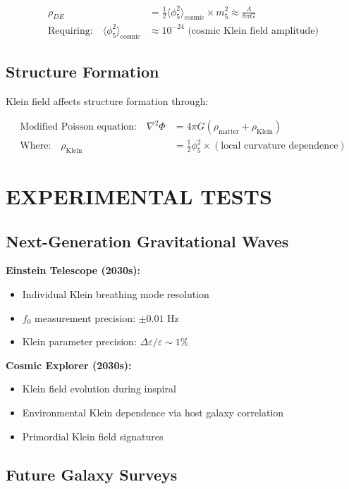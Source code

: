 \documentclass[12pt,a4paper]{article}
\begin{document}
\begin{align}
\rho_{DE} &= \frac{1}{2}\langle\phi_5^2\rangle_{\text{cosmic}} \times m_5^2 \approx \frac{\Lambda}{8\pi G}\\
\text{Requiring:} \quad \langle\phi_5^2\rangle_{\text{cosmic}} &\approx 10^{-24} \text{ (cosmic Klein field amplitude)}
\end{align}

\subsection{Structure Formation}

Klein field affects structure formation through:

\begin{align}
\text{Modified Poisson equation:} \quad \nabla^2\Phi &= 4\pi G(\rho_{\text{matter}} + \rho_{\text{Klein}})\\
\text{Where:} \quad \rho_{\text{Klein}} &= \frac{1}{2}\phi_5^2 \times (\text{local curvature dependence})
\end{align}

\section{EXPERIMENTAL TESTS}

\subsection{Next-Generation Gravitational Waves}

\textbf{Einstein Telescope (2030s):}
\begin{itemize}
\item Individual Klein breathing mode resolution
\item $f_0$ measurement precision: $\pm 0.01$ Hz
\item Klein parameter precision: $\Delta\varepsilon/\varepsilon \sim 1\%$
\end{itemize}

\textbf{Cosmic Explorer (2030s):}
\begin{itemize}
\item Klein field evolution during inspiral
\item Environmental Klein dependence via host galaxy correlation
\item Primordial Klein field signatures
\end{itemize}

\subsection{Future Galaxy Surveys}
\end{document}

